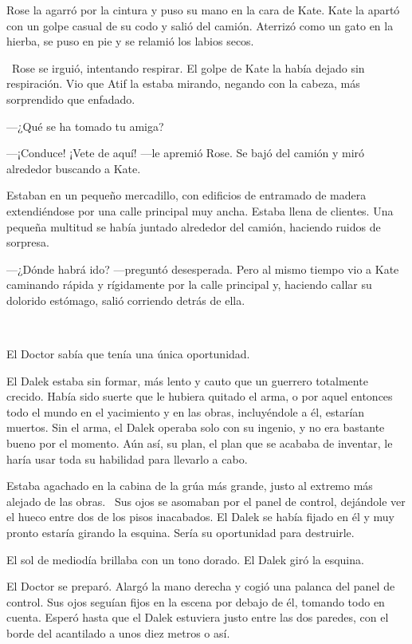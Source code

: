 Rose la agarró por la cintura y puso su mano en la cara de Kate. Kate la
apartó con un golpe casual de su codo y salió del camión. Aterrizó como
un gato en la hierba, se puso en pie y se relamió los labios secos.

~Rose se irguió, intentando respirar. El golpe de Kate la había dejado
sin respiración. Vio que Atif la estaba mirando, negando con la cabeza,
más sorprendido que enfadado.

---¿Qué se ha tomado tu amiga?

---¡Conduce! ¡Vete de aquí! ---le apremió Rose. Se bajó del camión y miró
alrededor buscando a Kate.

Estaban en un pequeño mercadillo, con edificios de entramado de madera
extendiéndose por una calle principal muy ancha. Estaba llena de
clientes. Una pequeña multitud se había juntado alrededor del camión,
haciendo ruidos de sorpresa.

---¿Dónde habrá ido? ---preguntó desesperada. Pero al mismo tiempo vio a
Kate caminando rápida y rígidamente por la calle principal y, haciendo
callar su dolorido estómago, salió corriendo detrás de ella.

~

El Doctor sabía que tenía una única oportunidad.

El Dalek estaba sin formar, más lento y cauto que un guerrero totalmente
crecido. Había sido suerte que le hubiera quitado el arma, o por aquel
entonces todo el mundo en el yacimiento y en las obras, incluyéndole a
él, estarían muertos. Sin el arma, el Dalek operaba solo con su ingenio,
y no era bastante bueno por el momento. Aún así, su plan, el plan que se
acababa de inventar, le haría usar toda su habilidad para llevarlo a
cabo.

Estaba agachado en la cabina de la grúa más grande, justo al extremo más
alejado de las obras. ~Sus ojos se asomaban por el panel de control,
dejándole ver el hueco entre dos de los pisos inacabados. El Dalek se
había fijado en él y muy pronto estaría girando la esquina. Sería su
oportunidad para destruirle.

El sol de mediodía brillaba con un tono dorado. El Dalek giró la
esquina.

El Doctor se preparó. Alargó la mano derecha y cogió una palanca del
panel de control. Sus ojos seguían fijos en la escena por debajo de él,
tomando todo en cuenta. Esperó hasta que el Dalek estuviera justo entre
las dos paredes, con el borde del acantilado a unos diez metros o así.

